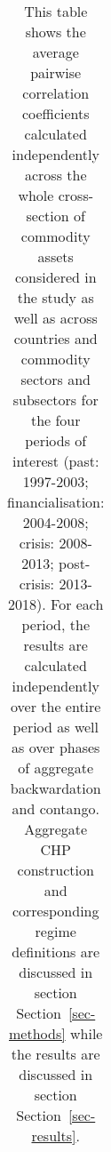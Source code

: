 \documentclass[
  authoryear,
  preprint,
  3p]{elsarticle}
\begin{document}
\newpage

\begingroup\fontsize{7}{9}\selectfont

\begin{longtable}[t]{>{}l>{}l>{}l>{}r>{}r>{}r>{}r>{}r}

\caption{\label{tbl-correlations-periods}This table shows the average
pairwise correlation coefficients calculated independently across the
whole cross-section of commodity assets considered in the study as well
as across countries and commodity sectors and subsectors for the four
periods of interest (past: 1997-2003; financialisation: 2004-2008;
crisis: 2008-2013; post-crisis: 2013-2018). For each period, the results
are calculated independently over the entire period as well as over
phases of aggregate backwardation and contango. Aggregate CHP
construction and corresponding regime definitions are discussed in
section Section~\ref{sec-methods} while the results are discussed in
section Section~\ref{sec-results}.}

\tabularnewline


\end{longtable}
\end{document}
